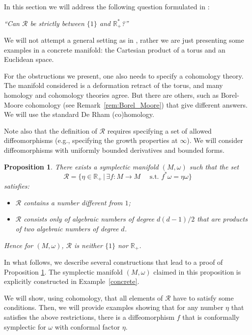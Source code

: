 \documentclass[11pt]{amsart}
\newtheorem{prop}[thm]{Proposition}
\theoremstyle{definition}
\theoremstyle{remark}
\numberwithin{equation}{section}
\newcommand{\R}{\mathbb R}
\def\real{{\mathbb R}}
\begin{document}
\medskip

In this section we will address the following question formulated in  \cite[p. 160]{ArnaudF24}:

\begin{center}{\em ``Can $\mathcal{R}$ be strictly between $\{1\}$ and ${\R}_+^*$?''}
\end{center}

We will not attempt a general setting as in \cite{ArnaudF24}, rather  we are
just presenting  some examples in a concrete
manifold: the Cartesian product of a torus and an Euclidean space.

For the obstructions we present,
one also needs to specify a cohomology theory.
The  manifold considered is a deformation retract of the torus, and many
homology and cohomology theories agree.
But there are others, such as Borel-Moore cohomology (see Remark~\ref{rem:Borel_Moore})
that give different answers.
We will use the standard De Rham (co)homology.

Note also that the definition of $\mathcal{R}$ requires specifying
a set of allowed diffeomorphisms (e.g., specifying the growth properties
at $\infty$).
We will
consider diffeomorphisms with uniformly
bounded derivatives and bounded forms.

\begin{prop}\label{prop:ArnaudF24}
 There exists a  symplectic manifold $(M, \omega)$ such that the set \[\mathcal{R} =
\{\eta \in \real_+ \,|\, \exists f:M\rightarrow M \quad \textrm{ s.t. } f^*\omega = \eta\omega\}\] satisfies:
  \begin{itemize}
  \item
    $\mathcal{R}$ contains a number different from $1$;
  \item
    $\mathcal{R}$  consists only of algebraic
    numbers of degree $d(d-1)/2$ that are products of
    two algebraic numbers of degree $d$.
  \end{itemize}
Hence for $(M, \omega)$,  $\mathcal{R}$ is neither $\{1\}$ nor $\mathbb{R}_+$.
\end{prop}

In what follows, we describe several constructions that lead to a proof of Proposition \ref{prop:ArnaudF24}.
The symplectic manifold $(M, \omega)$ claimed in this proposition
  is explicitly constructed in  Example~\ref{concrete}.

  We will show, using cohomology, that all elements of $\mathcal{R}$
  have to satisfy some conditions. Then, we will provide examples
  showing that for any number $\eta$ that satisfies the above restrictions,
  there is a diffeomorphism $f$ that is conformally symplectic for $\omega$
  with conformal factor $\eta$.
\end{document}

